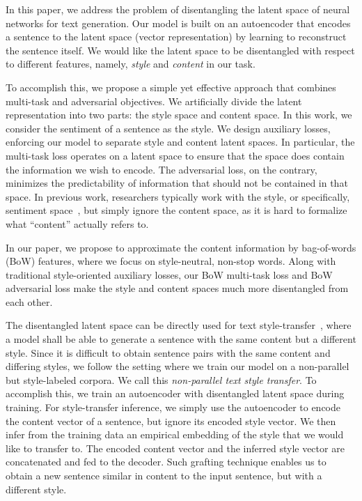 \documentclass[letterpaper]{article} %
\begin{document}
In this paper, we address the problem of disentangling the latent space of neural networks for text generation.
Our model is built on an autoencoder that encodes a sentence to the latent space (vector representation) by learning to reconstruct the sentence itself.
We would like the latent space to be disentangled with respect to different features, namely, \textit{style} and \textit{content} in our task.

To accomplish this, we propose a simple yet effective approach that combines multi-task and adversarial objectives. We artificially divide the latent representation into two parts: the style space and content space. In this work, we consider the sentiment of a sentence as the style.
We design auxiliary losses, enforcing our model to separate style and content latent spaces.
In particular, the multi-task loss operates on a latent space to ensure that the space does contain the information we wish to encode.
The adversarial loss, on the contrary, minimizes the predictability of information that should not be contained in that space.
In previous work, researchers typically work with the style, or specifically, sentiment space~\cite{hu2017toward,shen2017style,fu2018style,zhao2018adversarially}, but simply ignore the content space, as it is hard to formalize what ``content'' actually refers to.

In our paper, we propose to approximate the content information by bag-of-words (BoW) features, where we focus on style-neutral, non-stop words.
Along with traditional style-oriented auxiliary losses, our BoW multi-task loss and BoW adversarial loss make the style and content spaces much more disentangled from each other.

The disentangled latent space can be directly used for text style-transfer~\cite{hu2017toward,shen2017style,fu2018style}, where a model shall be able to generate a sentence with the same content but a different style.
Since it is difficult to obtain sentence pairs with the same content and differing styles, we follow the setting where we train our model on a non-parallel but style-labeled corpora. We call this \textit{non-parallel text style transfer}.
To accomplish this, we train an autoencoder with disentangled latent space during training.
For style-transfer inference, we simply use the autoencoder to encode the content vector of a sentence, but ignore its encoded style vector.
We then infer from the training data an empirical embedding of the style that we would like to transfer to.
The encoded content vector and the inferred style vector are concatenated and fed to the decoder.
Such grafting technique enables us to obtain a new sentence similar in content to the input sentence, but with a different style.
\end{document}
